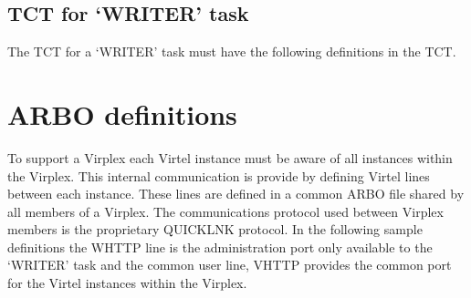 \documentclass[letterpaper,10pt,english]{sphinxmanual}
\begin{document}
\subsection{TCT for ‘WRITER’ task}
\label{\detokenize{connectivity_guide:tct-for-writer-task}}
\sphinxAtStartPar
The TCT for a ‘WRITER’ task must have the following definitions in the TCT.

\begin{sphinxVerbatim}[commandchars=\\\{\}]
                               
                              
  
                   
  
                       
                       
\end{sphinxVerbatim}

\ignorespaces 

\section{ARBO definitions}
\label{\detokenize{connectivity_guide:arbo-definitions}}\label{\detokenize{connectivity_guide:index-185}}
\sphinxAtStartPar
To support a Virplex each Virtel instance must be aware of all instances within the Virplex. This internal communication is provide by defining Virtel lines between each instance. These lines are defined in a common ARBO file shared by all members of a Virplex. The communications protocol used between Virplex members is the proprietary QUICKLNK protocol. In the following sample definitions the W\sphinxhyphen{}HTTP line is the administration port only available to the ‘WRITER’ task and the common user line, V\sphinxhyphen{}HTTP provides the common port for the Virtel instances within the Virplex.
\end{document}
